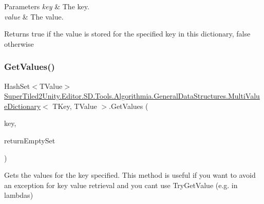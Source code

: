 \begin{DoxyParams}{Parameters}
{\em key} & The key.\\
\hline
{\em value} & The value.\\
\hline
\end{DoxyParams}
\begin{DoxyReturn}{Returns}
true if the value is stored for the specified key in this dictionary, false otherwise
\end{DoxyReturn}
\mbox{\label{class_super_tiled2_unity_1_1_editor_1_1_s_d_1_1_tools_1_1_algorithmia_1_1_general_data_structures_1_1_multi_value_dictionary_a6e30cf7a205e22c3c87e88acdc3f778e}} 
\subsubsection{\texorpdfstring{Get\+Values()}{GetValues()}}
{\footnotesize\ttfamily Hash\+Set$<$T\+Value$>$ \mbox{\hyperlink{class_super_tiled2_unity_1_1_editor_1_1_s_d_1_1_tools_1_1_algorithmia_1_1_general_data_structures_1_1_multi_value_dictionary}{Super\+Tiled2\+Unity.\+Editor.\+S\+D.\+Tools.\+Algorithmia.\+General\+Data\+Structures.\+Multi\+Value\+Dictionary}}$<$ T\+Key, T\+Value $>$.Get\+Values (\begin{DoxyParamCaption}\item[{T\+Key}]{key,  }\item[{bool}]{return\+Empty\+Set }\end{DoxyParamCaption})}



Gets the values for the key specified. This method is useful if you want to avoid an exception for key value retrieval and you can\textquotesingle{}t use Try\+Get\+Value (e.\+g. in lambdas) 


